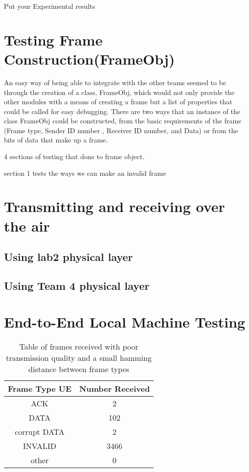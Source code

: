 
Put your Experimental results
\section{Testing Frame Construction(FrameObj)}
An easy way of being able to integrate with the other teams seemed to be through the creation of a class, FrameObj, which would not only provide the other modules with a means of creating a frame but a list of properties that could be called for easy debugging. There are two ways that an instance of the class FrameObj could be constructed,  from the basic requirements of the frame (Frame type, Sender ID number , Receiver ID number, and Data) or from the bits of data that make up a frame.

4 sections of testing that done to frame object. 

section 1 tests the ways we can make an invalid frame







\section{Transmitting and receiving over the air}
\subsection{Using lab2 physical layer}
\subsection{Using Team 4 physical layer}
\section{End-to-End Local Machine Testing }

\begin{table}
	\centering
		\begin{tabular}{| c | c | }
		\hline                       
		Frame Type UE & Number Received\\
		\hline
			ACK & 2\\
			DATA & 102\\
			corrupt DATA & 2\\
			INVALID & 3466\\
			other & 0\\
		\hline
		\end{tabular}
	\caption{Table of frames received with poor transmission quality and a small hamming distance between frame types}
	\label{tab:2ACK}
\end{table}

